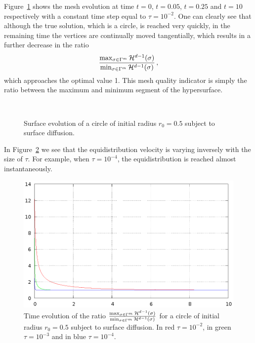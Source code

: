 Figure~\ref{fig:sd_circle} shows the mesh evolution at time $t=0$, $t=0.05$,
$t=0.25$ and $t=10$ respectively with a constant time step equal to
$\tau=10^{-2}$. One can clearly see that although the true solution, which is a
circle, is reached very quickly, in the remaining time the vertices are
continually moved tangentially, which results in a further decrease in the ratio
\begin{equation}
\frac{\max_{\sigma\in \Gamma^m}\mathcal{H}^{d-1}(\sigma)}
{\min_{\sigma\in\Gamma^m}\mathcal{H}^{d-1}(\sigma)}\,,
\end{equation}
which approaches the optimal value 1. This mesh quality indicator is simply the
ratio between the maximum and minimum segment of the hypersurface.

\begin{figure}[htbp]
\centering
{}
\\
\caption[Surface diffusion equidistribution property]{Surface evolution of a
circle of initial radius $r_0=0.5$ subject to surface diffusion.}
\label{fig:sd_circle}
\end{figure}

In Figure~\ref{fig:sd_circle_tau} we see that the equidistribution velocity is
varying inversely with the size of $\tau$. For example, when $\tau=10^{-4}$,
the equidistribution is reached almost instantaneously.

\begin{figure}[htbp]
\centering
\includegraphics[width=.45\textwidth]
{figures/geometric_pdes/sd_circle_tau.ps}
\caption[\sloppy Surface diffusion equidistribution velocity]{Time evolution of
the ratio $\frac{\max_{\sigma\in \Gamma^m}\mathcal{H}^{d-1}(\sigma)}
{\min_{\sigma\in\Gamma^m}\mathcal{H}^{d-1}(\sigma)}$ for a circle of initial radius
${r_0=0.5}$ subject to surface diffusion. In red $\tau=10^{-2}$, in green
$\tau=10^{-3}$ and in blue $\tau=10^{-4}$.}
\label{fig:sd_circle_tau}
\end{figure}

